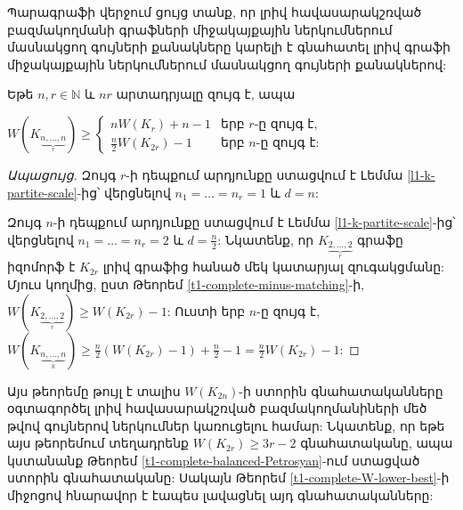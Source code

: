 Պարագրաֆի վերջում ցույց տանք, որ լրիվ հավասարակշռված բազմակողմանի գրաֆների միջակայքային ներկումներում մասնակցող գույների քանակները կարելի է գնահատել լրիվ գրաֆի միջակայքային ներկումներում մասնակցող գույների քանակներով:

\begin{theorem}
\label{t1_multipartite_complete}
Եթե $n,r\in \mathbb{N}$ և $nr$ արտադրյալը զույգ է, ապա
\begin{center}
$W\left(K_{\underbrace{\scriptstyle n,\ldots,n}_{r}}\right) \geq 
\left\{\begin{matrix}
 nW(K_r) + n -1 & \text{երբ }r\text{-ը զույգ է,} \\ 
 \frac{n}{2}W(K_{2r}) - 1 &  \text{երբ }n\text{-ը զույգ է:} 
\end{matrix}\right.$
\end{center}
\end{theorem}
\begin{proof}[Ապացույց]
Զույգ $r$-ի դեպքում արդյունքը ստացվում է Լեմմա \ref{l1-k-partite-scale}-ից՝ վերցնելով $n_1=\ldots=n_r=1$ և $d=n$:

Զույգ $n$-ի դեպքում արդյունքը ստացվում է
Լեմմա \ref{l1-k-partite-scale}-ից՝ վերցնելով $n_1=\ldots=n_r=2$ և $d=\frac{n}{2}$: Նկատենք, որ $K_{\underbrace{\scriptstyle 2,\ldots,2}_{r}}$ գրաֆը իզոմորֆ է $K_{2r}$ լրիվ գրաֆից հանած մեկ կատարյալ զուգակցմանը: Մյուս կողմից, ըստ Թեորեմ \ref{t1-complete-minus-matching}-ի, $W(K_{\underbrace{\scriptstyle 2,\ldots,2}_{r}}) \geq W(K_{2r})-1$: Ուստի երբ $n$-ը զույգ է, $W(K_{\underbrace{\scriptstyle n,\ldots,n}_{k}}) \geq \frac{n}{2}\left(W(K_{2r})-1\right) + \frac{n}{2} -1 =  \frac{n}{2}W(K_{2r})-1$:
\end{proof}

Այս թեորեմը թույլ է տալիս $W(K_{2n})$-ի ստորին գնահատականները օգտագործել լրիվ հավասարակշռված բազմակողմանիների մեծ թվով գույներով ներկումներ կառուցելու համար: Նկատենք, որ եթե այս թեորեմում տեղադրենք $W(K_{2r}) \geq 3r-2$ գնահատականը, ապա կստանանք Թեորեմ \ref{t1-complete-balanced-Petrosyan}-ում ստացված ստորին գնահատականը: Սակայն Թեորեմ \ref{t1-complete-W-lower-best}-ի միջոցով հնարավոր է էապես լավացնել այդ գնահատականները:

